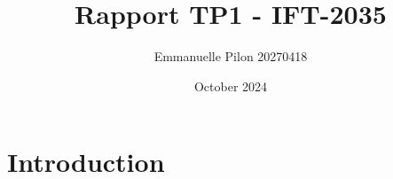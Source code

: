 \documentclass{article}
\title{Rapport TP1 - IFT-2035}
\author{Emmanuelle Pilon 20270418}
\date{October 2024}
\begin{document}
\maketitle

\section{Introduction}
\end{document}
